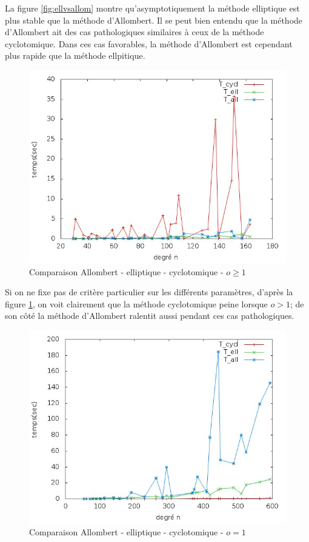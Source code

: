 \documentclass[a4paper]{article} %
\numberwithin{section}{part}
\numberwithin{equation}{section}
\begin{document}
La figure \ref{fig:ellvsallom} montre qu'asymptotiquement la méthode
elliptique est plus stable que la méthode d'Allombert. Il se peut bien entendu 
que la méthode d'Allombert ait des cas pathologiques similaires à ceux de la 
méthode cyclotomique. Dans ces cas favorables, la méthode d'Allombert est
cependant plus rapide que la méthode ellpitique.


\begin{figure}[H]
\centering
\includegraphics[scale=0.6]{data_test14_cmpellFFH8}
\caption{Comparaison Allombert - elliptique - cyclotomique - $o\geq1$}
\label{fig:ellvsallomvscyclgen}
\end{figure}

Si on ne fixe pas de critère particulier sur les différents paramètres, d'après
la figure \ref{fig:ellvsallomvscyclgen}, on voit clairement que la méthode
cyclotomique peine lorsque $o > 1$; de son côté la méthode d'Allombert ralentit
aussi pendant ces cas pathologiques.

\begin{figure}[H]
\centering
\includegraphics[scale=0.6]{data_test7_flint1}
\caption{Comparaison Allombert - elliptique - cyclotomique - $o=1$}
\label{fig:ellvsallomvscyclsansext}
\end{figure}
\end{document}
